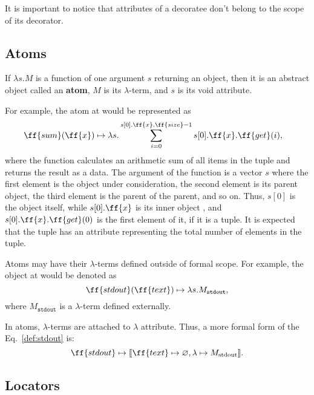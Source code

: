 It is important to notice that attributes of a decoratee
don't belong to the scope of its decorator.

\subsection{Atoms}

\begin{definition}\label{def:atom}
If \(\lambda s.M\) is a function of one argument \(s\) returning an object,
then it is an abstract object called an \textbf{atom}, \(M\) is its \(\lambda\)-term,
and \(s\) is its void attribute.
\end{definition}

For example, the atom at  would be represented as
\begin{equation}
\begin{split}
& \ff{sum}(\ff{x}) \mapsto \lambda s . \sum\limits_{i=0}^{s[0].\ff{x}.\ff{size} - 1} s[0].\ff{x}.\ff{get}(i),
\end{split}
\end{equation}
where the function calculates an arithmetic sum of all items
in the tuple  and returns the result as a data. The argument of
the function is a vector \(s\) where the first element is the object under
consideration, the second element is its parent object, the third element
is the parent of the parent, and so on. Thus, \(s[0]\) is the object
 itself, while \(s[0].\ff{x}\) is its inner object ,
and \(s[0].\ff{x}.\ff{get}(0)\) is the first element of it, if it is a tuple.
It is expected that the tuple has an attribute  representing
the total number of elements in the tuple.

Atoms may have their \(\lambda\)-terms defined outside of \phic{} formal scope.
For example, the object at  would be denoted as
\begin{equation}\label{def:stdout}
\ff{stdout}(\ff{text}) \mapsto \lambda s.M_\texttt{stdout},
\end{equation}
where \(M_\texttt{stdout}\) is a \(\lambda\)-term defined externally.

In atoms, \(\lambda\)-terms are attached to \(\lambda\) attribute.
Thus, a more formal form of the Eq.~\ref{def:stdout} is:
\begin{equation*}
\ff{stdout} \mapsto \llbracket \ff{text} \mapsto \varnothing, \lambda \mapsto M_\text{stdout} \rrbracket.
\end{equation*}

\subsection{Locators}

